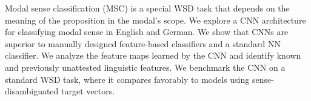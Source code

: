 Modal sense classification (MSC) is a special WSD task that depends on the meaning of the proposition in the modal's scope. We explore a CNN architecture for classifying modal sense in English and German. We show that CNNs are superior to manually designed feature-based classifiers and a standard NN classifier. We analyze the feature maps learned by the CNN and identify known and previously unattested linguistic features. We benchmark the CNN on a standard WSD task, where it compares favorably to models using sense-disambiguated target vectors.
